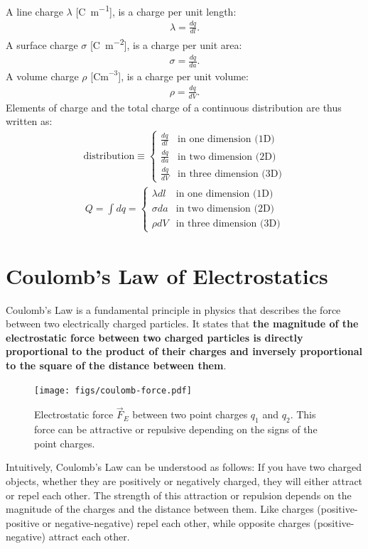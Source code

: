 \documentclass[12pt,b4paper]{article}
\begin{document}
A line charge $\lambda$ [\unit{\coulomb\per\meter}], is a charge per unit length:
\begin{align}
    \lambda=\frac{dq}{dl}.
\end{align}
A surface charge $\sigma$ [\unit{\coulomb\per\meter\squared}], is a charge per unit area:
\begin{align}
    \sigma=\frac{dq}{da}.
\end{align}
A volume charge $\rho$ [$\unit{\coulomb\meter}^{-3}$], is a charge per unit volume:
\begin{align}
    \rho=\frac{dq}{dV}.
\end{align}
Elements of charge and the total charge of a continuous distribution are thus written as:
\begin{align}
    \text{distribution}\equiv
    \begin{cases}
      \displaystyle \frac{dq}{dl} & \text{in one dimension (1D)}\\[10pt]
      \displaystyle \frac{dq}{da} & \text{in two dimension (2D)}\\[10pt]
      \displaystyle \frac{dq}{dV} & \text{in three dimension (3D)}
    \end{cases} 
\end{align}
\begin{align}
    Q=\int dq=
    \begin{cases}
      \lambda dl & \text{in one dimension (1D)}\\[5pt]
      \sigma da & \text{in two dimension (2D)}\\[5pt]
      \rho dV & \text{in three dimension (3D)}
    \end{cases} 
\end{align}
\section{Coulomb's Law of Electrostatics}
Coulomb's Law is a fundamental principle in physics that describes the force between two electrically charged particles. It states that \textbf{the magnitude of the electrostatic force between two charged particles is directly proportional to the product of their charges and inversely proportional to the square of the distance between them}.
\begin{figure}[H]
    \centering
    \texttt{[image: figs/coulomb-force.pdf]}
    \caption{Electrostatic force $\vec{F}_E$ between two point charges $q_1$ and $q_2$. This force can be attractive or repulsive depending on the signs of the point charges.}
    \label{fig:coulomb-force}
\end{figure}
Intuitively, Coulomb's Law can be understood as follows: If you have two charged objects, whether they are positively or negatively charged, they will either attract or repel each other. The strength of this attraction or repulsion depends on the magnitude of the charges and the distance between them. Like charges (positive-positive or negative-negative) repel each other, while opposite charges (positive-negative) attract each other.
\end{document}

